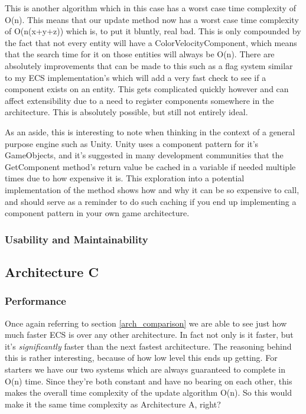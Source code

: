 \documentclass{article}
\begin{document}
\bigskip

This is another algorithm which in this case has a worst case time complexity
of O(n). This means that our update method now has a worst case time complexity
of O(n(x+y+z)) which is, to put it bluntly, real bad. This is only compounded by
the fact that not every entity will have a ColorVelocityComponent, which means
that the search time for it on those entities will always be O(n). There are
absolutely improvements that can be made to this such as a flag system similar
to my ECS implementation's which will add a very fast check to see if a
component exists on an entity. This gets complicated quickly however and can
affect extensibility due to a need to register components somewhere in the
architecture. This is absolutely possible, but still not entirely ideal.

As an aside, this is interesting to note when thinking in the context of a
general purpose engine such as Unity. Unity uses a component pattern for it's
GameObjects, and it's suggested in many development communities that the
GetComponent method's return value be cached in a variable if needed multiple
times due to how expensive it is. This exploration into a potential
implementation of the method shows how and why it can be so expensive to call,
and should serve as a reminder to do such caching if you end up implementing a
component pattern in your own game architecture.

\subsubsection{Usability and Maintainability}

\subsection{Architecture C}
\subsubsection{Performance}
Once again referring to section \ref{arch_comparison} we are able to see just
how much faster ECS is over any other architecture. In fact not only is it
faster, but it's \textit{significantly} faster than the next fastest
architecture. The reasoning behind this is rather interesting, because of how
low level this ends up getting. For starters we have our two systems which are
always guaranteed to complete in O(n) time. Since they're both constant
and have no bearing on each other, this makes the overall time complexity of
the update algorithm O(n). So this would make it the same time complexity as
Architecture A, right?
\end{document}
